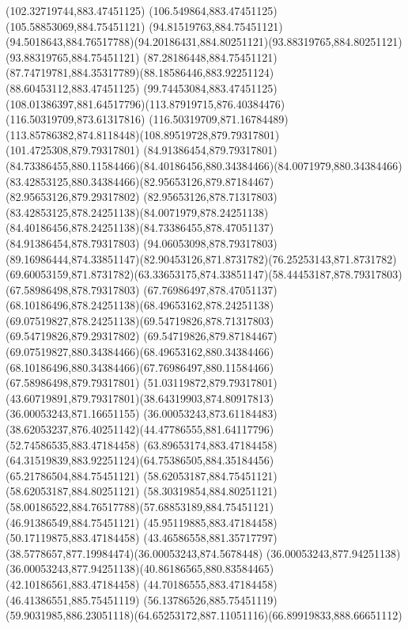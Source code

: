 {{	\closepath
	\moveto(102.32719744,883.47451125)
	\lineto(106.549864,883.47451125)
	\lineto(105.58853069,884.75451121)
	\lineto(94.81519763,884.75451121)
	\curveto(94.5018643,884.76517788)(94.20186431,884.80251121)(93.88319765,884.80251121)
	\lineto(93.88319765,884.75451121)
	\lineto(87.28186448,884.75451121)
	\curveto(87.74719781,884.35317789)(88.18586446,883.92251124)(88.60453112,883.47451125)
	\lineto(99.74453084,883.47451125)
	\curveto(108.01386397,881.64517796)(113.87919715,876.40384476)(116.50319709,873.61317816)
	\lineto(116.50319709,871.16784489)
	\curveto(113.85786382,874.8118448)(108.89519728,879.79317801)(101.4725308,879.79317801)
	\lineto(84.91386454,879.79317801)
	\curveto(84.73386455,880.11584466)(84.40186456,880.34384466)(84.0071979,880.34384466)
	\curveto(83.42853125,880.34384466)(82.95653126,879.87184467)(82.95653126,879.29317802)
	\curveto(82.95653126,878.71317803)(83.42853125,878.24251138)(84.0071979,878.24251138)
	\curveto(84.40186456,878.24251138)(84.73386455,878.47051137)(84.91386454,878.79317803)
	\lineto(94.06053098,878.79317803)
	\curveto(89.16986444,874.33851147)(82.90453126,871.8731782)(76.25253143,871.8731782)
	\curveto(69.60053159,871.8731782)(63.33653175,874.33851147)(58.44453187,878.79317803)
	\lineto(67.58986498,878.79317803)
	\curveto(67.76986497,878.47051137)(68.10186496,878.24251138)(68.49653162,878.24251138)
	\curveto(69.07519827,878.24251138)(69.54719826,878.71317803)(69.54719826,879.29317802)
	\curveto(69.54719826,879.87184467)(69.07519827,880.34384466)(68.49653162,880.34384466)
	\curveto(68.10186496,880.34384466)(67.76986497,880.11584466)(67.58986498,879.79317801)
	\lineto(51.03119872,879.79317801)
	\curveto(43.60719891,879.79317801)(38.64319903,874.80917813)(36.00053243,871.16651155)
	\lineto(36.00053243,873.61184483)
	\curveto(38.62053237,876.40251142)(44.47786555,881.64117796)(52.74586535,883.47184458)
	\lineto(63.89653174,883.47184458)
	\curveto(64.31519839,883.92251124)(64.75386505,884.35184456)(65.21786504,884.75451121)
	\lineto(58.62053187,884.75451121)
	\lineto(58.62053187,884.80251121)
	\curveto(58.30319854,884.80251121)(58.00186522,884.76517788)(57.68853189,884.75451121)
	\lineto(46.91386549,884.75451121)
	\lineto(45.95119885,883.47184458)
	\lineto(50.17119875,883.47184458)
	\curveto(43.46586558,881.35717797)(38.5778657,877.19984474)(36.00053243,874.5678448)
	\lineto(36.00053243,877.94251138)
	\curveto(36.00053243,877.94251138)(40.86186565,880.83584465)(42.10186561,883.47184458)
	\lineto(44.70186555,883.47184458)
	\lineto(46.41386551,885.75451119)
	\lineto(56.13786526,885.75451119)
	\curveto(59.9031985,886.23051118)(64.65253172,887.11051116)(66.89919833,888.66651112)
}}

